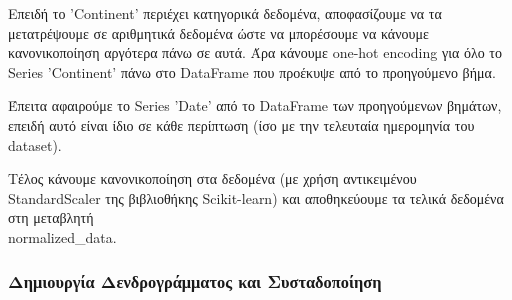 \documentclass[12pt,a4paper]{article}
\begin{document}
Επειδή το 'Continent' περιέχει κατηγορικά δεδομένα, αποφασίζουμε να τα μετατρέψουμε σε αριθμητικά δεδομένα ώστε να μπορέσουμε να κάνουμε κανονικοποίηση αργότερα πάνω σε αυτά. Άρα κάνουμε one-hot encoding για όλο το Series 'Continent' πάνω στο DataFrame που προέκυψε από το προηγούμενο βήμα.

Έπειτα αφαιρούμε το Series 'Date' από το DataFrame των προηγούμενων βημάτων, επειδή αυτό είναι ίδιο σε κάθε περίπτωση (ίσο με την τελευταία ημερομηνία του dataset).

Τέλος κάνουμε κανονικοποίηση στα δεδομένα (με χρήση αντικειμένου StandardScaler της βιβλιοθήκης Scikit-learn) και αποθηκεύουμε τα τελικά δεδομένα στη μεταβλητή \\normalized\_data.

\subsubsection{Δημιουργία Δενδρογράμματος και Συσταδοποίηση}
\end{document}

